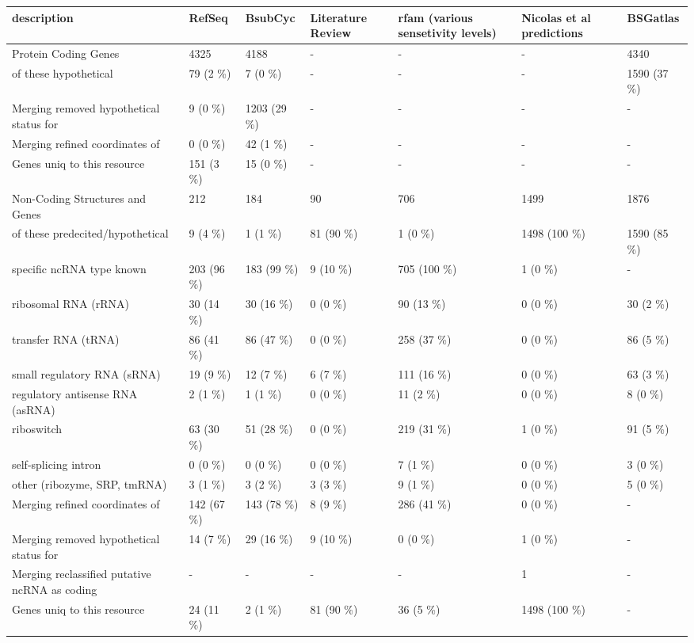 \centering
\begin{tabular}{lllllll}
\toprule
description & RefSeq & BsubCyc & Literature Review & rfam (various sensetivity levels) & Nicolas et al predictions & BSGatlas\\
\midrule
Protein Coding Genes & 4325 & 4188 & - & - & - & 4340\\
\hspace{1em}of these hypothetical & 79 (2 \%) & 7 (0 \%) & - & - & - & 1590 (37 \%)\\
Merging removed hypothetical status for & 9 (0 \%) & 1203 (29 \%) & - & - & - & -\\
Merging refined coordinates of & 0 (0 \%) & 42 (1 \%) & - & - & - & -\\
Genes uniq to this resource & 151 (3 \%) & 15 (0 \%) & - & - & - & -\\
\hline
Non-Coding Structures and Genes & 212 & 184 & 90 & 706 & 1499 & 1876\\
\hspace{1em}of these predecited/hypothetical & 9 (4 \%) & 1 (1 \%) & 81 (90 \%) & 1 (0 \%) & 1498 (100 \%) & 1590 (85 \%)\\
specific ncRNA type known & 203 (96 \%) & 183 (99 \%) & 9 (10 \%) & 705 (100 \%) & 1 (0 \%) & -\\
\hspace{1em}ribosomal RNA (rRNA) & 30 (14 \%) & 30 (16 \%) & 0 (0 \%) & 90 (13 \%) & 0 (0 \%) & 30 (2 \%)\\
\hspace{1em}transfer RNA (tRNA) & 86 (41 \%) & 86 (47 \%) & 0 (0 \%) & 258 (37 \%) & 0 (0 \%) & 86 (5 \%)\\
\hspace{1em}small regulatory RNA (sRNA) & 19 (9 \%) & 12 (7 \%) & 6 (7 \%) & 111 (16 \%) & 0 (0 \%) & 63 (3 \%)\\
\hspace{1em}regulatory antisense RNA (asRNA) & 2 (1 \%) & 1 (1 \%) & 0 (0 \%) & 11 (2 \%) & 0 (0 \%) & 8 (0 \%)\\
\hspace{1em}riboswitch & 63 (30 \%) & 51 (28 \%) & 0 (0 \%) & 219 (31 \%) & 1 (0 \%) & 91 (5 \%)\\
\hspace{1em}self-splicing intron & 0 (0 \%) & 0 (0 \%) & 0 (0 \%) & 7 (1 \%) & 0 (0 \%) & 3 (0 \%)\\
\hspace{1em}other (ribozyme, SRP, tmRNA) & 3 (1 \%) & 3 (2 \%) & 3 (3 \%) & 9 (1 \%) & 0 (0 \%) & 5 (0 \%)\\
Merging refined coordinates of & 142 (67 \%) & 143 (78 \%) & 8 (9 \%) & 286 (41 \%) & 0 (0 \%) & -\\
Merging removed hypothetical status for & 14 (7 \%) & 29 (16 \%) & 9 (10 \%) & 0 (0 \%) & 1 (0 \%) & -\\
Merging reclassified putative ncRNA as coding & - & - & - & - & 1 & -\\
Genes uniq to this resource & 24 (11 \%) & 2 (1 \%) & 81 (90 \%) & 36 (5 \%) & 1498 (100 \%) & -\\
\bottomrule
\end{tabular}
